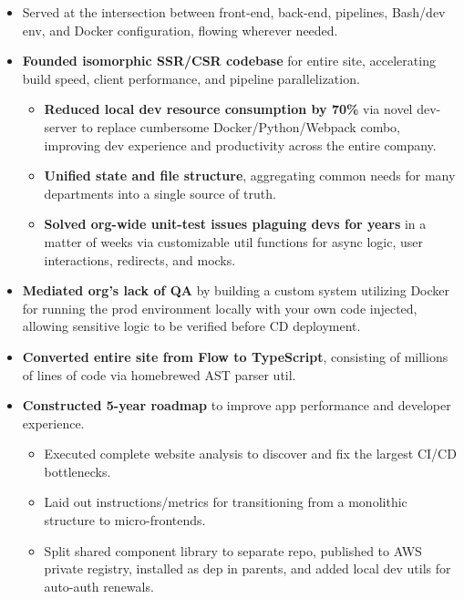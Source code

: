\documentclass[10pt, letterpaper]{article}
\newcommand{\ul}[1]{%
    \begin{itemize}%
    #1%
    \end{itemize}%
}
\newcommand{\code}[1]{\small{\texttt{#1}}}
\begin{document}
\ul{
    \item Served at the intersection between front-end, back-end, pipelines, Bash/dev env, and Docker configuration, flowing wherever needed.

    \item \textbf{Founded isomorphic SSR/CSR codebase} for entire site, accelerating build speed, client performance, and pipeline parallelization.
    \ul {
        \item \textbf{Reduced local dev resource consumption by 70\%} via novel dev-server to replace cumbersome Docker/Python/Webpack combo, improving dev experience and productivity across the entire company.

        \item \textbf{Unified state and file structure}, aggregating common needs for many departments into a single source of truth.

        \item \textbf{Solved org-wide unit-test issues plaguing devs for years} in a matter of weeks via customizable util functions for async logic, user interactions, redirects, and mocks.
    }

    \item \textbf{Mediated org's lack of QA} by building a custom system utilizing Docker for running the prod environment locally with your own code injected, allowing sensitive logic to be verified before CD deployment.

    \item \textbf{Converted entire site from Flow to TypeScript}, consisting of millions of lines of code via homebrewed AST parser util.

    \item \textbf{Constructed 5-year roadmap} to improve app performance and developer experience.
    \ul {
        \item Executed complete website analysis to discover and fix the largest CI/CD bottlenecks.

        \item Laid out instructions/metrics for transitioning from a monolithic structure to micro-frontends.

        \item Split shared component library to separate repo, published to AWS private registry, installed as dep in parents, and added local dev utils for auto-auth renewals.
    }

}
\end{document}
